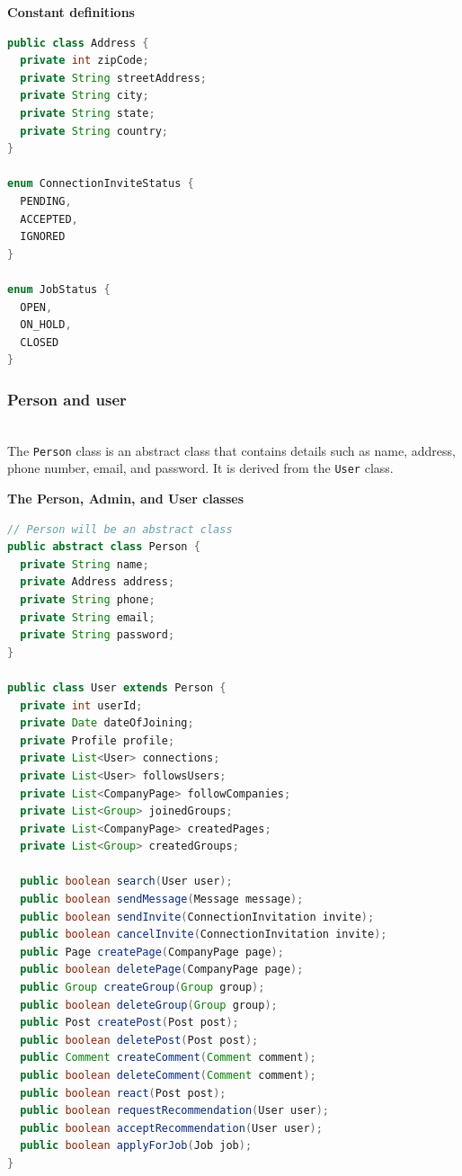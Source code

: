 \textbf{Constant definitions}

\begin{lstlisting}[language=Java]
public class Address {
  private int zipCode;
  private String streetAddress;
  private String city;
  private String state;
  private String country;
}

enum ConnectionInviteStatus {
  PENDING, 
  ACCEPTED,
  IGNORED
}

enum JobStatus {
  OPEN,
  ON_HOLD,
  CLOSED
}
\end{lstlisting}

\subsubsection{Person and user}\label{KXhfpzME__dgiH9DoEzPZ}
\\
The \texttt{Person} class is an abstract class that contains details such as name, address, phone number, email, and password. It is derived from the \texttt{User} class.

\textbf{The Person, Admin, and User classes}

\begin{lstlisting}[language=Java]
// Person will be an abstract class
public abstract class Person {
  private String name;
  private Address address;
  private String phone;
  private String email;
  private String password;
}

public class User extends Person {
  private int userId;
  private Date dateOfJoining;
  private Profile profile;
  private List<User> connections;
  private List<User> followsUsers;
  private List<CompanyPage> followCompanies;
  private List<Group> joinedGroups;
  private List<CompanyPage> createdPages;
  private List<Group> createdGroups;

  public boolean search(User user);
  public boolean sendMessage(Message message);
  public boolean sendInvite(ConnectionInvitation invite);
  public boolean cancelInvite(ConnectionInvitation invite);
  public Page createPage(CompanyPage page);
  public boolean deletePage(CompanyPage page);
  public Group createGroup(Group group);
  public boolean deleteGroup(Group group);
  public Post createPost(Post post);
  public boolean deletePost(Post post);
  public Comment createComment(Comment comment);
  public boolean deleteComment(Comment comment);
  public boolean react(Post post);
  public boolean requestRecommendation(User user);
  public boolean acceptRecommendation(User user);
  public boolean applyForJob(Job job);
}
\end{lstlisting}


